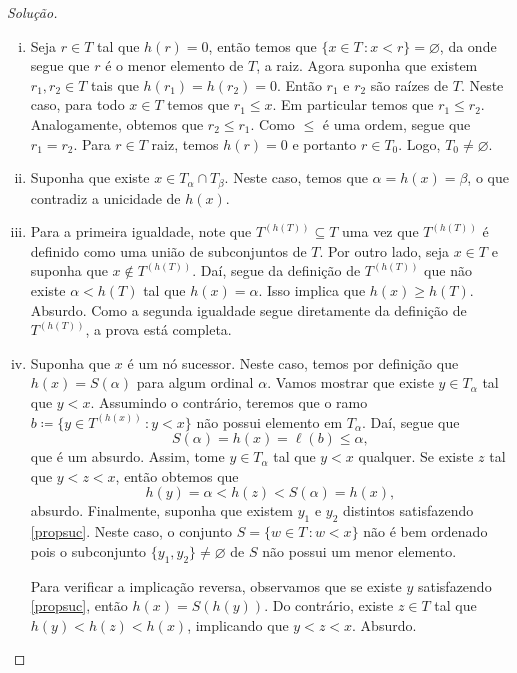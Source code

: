 \documentclass[a4paper]{article}
\begin{document}
\begin{proof}[Solução]\hfill
  \begin{enumerate}[(i)]

  \item Seja \(r\in T\) tal que \(h(r)=0\), então temos que \(\{x\in T\,\colon
    x<r\}=\varnothing\), da onde segue que \(r\) é o menor elemento de \(T\), a raiz.
    Agora suponha que existem \(r_1, r_2\in T\) tais que \(h(r_1)=h(r_2)=0\). Então \(r_1\) e
    \(r_2\) são raízes de \(T\). Neste caso,  para todo \(x\in T\) temos que
    \(r_1\leq x\). Em particular temos que \(r_1\leq r_2\).
    Analogamente, obtemos que \(r_2\leq r_1\). Como \(\leq\) é
    uma ordem, segue que \(r_1=r_2\). Para \(r\in T\) raiz, temos \(h(r)=0\) e portanto
    \(r\in T_0\). Logo, \(T_0\not=\varnothing\).
    
  \item Suponha que existe \(x\in T_\alpha\cap T_\beta\). Neste caso, temos que
    \(\alpha=h(x)=\beta\), o que contradiz a unicidade de \(h(x)\).

  \item Para a primeira igualdade, note que \(T^{(h(T))}\subseteq T\) uma vez
    que \(T^{(h(T))}\) é definido como uma união de subconjuntos de \(T\). Por
    outro lado, seja \(x\in T\) e suponha que \(x\not\in T^{(h(T))}\). Daí,
    segue da definição de \(T^{(h(T))}\) que não existe \(\alpha < h(T)\) tal
    que \(h(x)=\alpha\). Isso implica
    que \(h(x)\geq h(T)\). Absurdo. Como a segunda igualdade segue diretamente da
    definição de \(T^{(h(T))}\), a prova está completa. 

  \item Suponha que \(x\) é um nó sucessor. Neste caso, temos por definição
    que \(h(x)=S(\alpha)\) para algum ordinal \(\alpha\). Vamos mostrar que
    existe \(y\in T_\alpha\) tal que \(y < x\). Assumindo o contrário, teremos
    que o ramo \(b\coloneqq\{y\in T^{(h(x))}\,\colon y<x\}\) não possui elemento em
    \(T_\alpha\). Daí, segue que \[S(\alpha)=h(x)=\ell(b)\leq\alpha,\] que é um absurdo. 
    Assim, tome \(y\in T_\alpha\) tal que \(y<x\) qualquer. Se
    existe \(z\) tal que \(y<z<x\), então obtemos
    que \[h(y)=\alpha<h(z)<S(\alpha)=h(x),\] 
    absurdo. Finalmente, suponha que existem \(y_1\) e \(y_2\) distintos satisfazendo
    \eqref{propsuc}. Neste caso, o conjunto \(S=\{w\in
    T\,\colon w <x\}\) não é bem ordenado pois o subconjunto
    \(\{y_1,y_2\}\not = \varnothing\) de \(S\) não possui um menor elemento.

    Para verificar a implicação reversa, observamos que se existe \(y\) satisfazendo
    \eqref{propsuc}, então \(h(x)=S(h(y))\). Do contrário, existe \(z\in T\) tal
    que \(h(y)<h(z)<h(x)\), implicando que \(y<z<x\). Absurdo.


\end{enumerate}
\end{proof}
\end{document}
